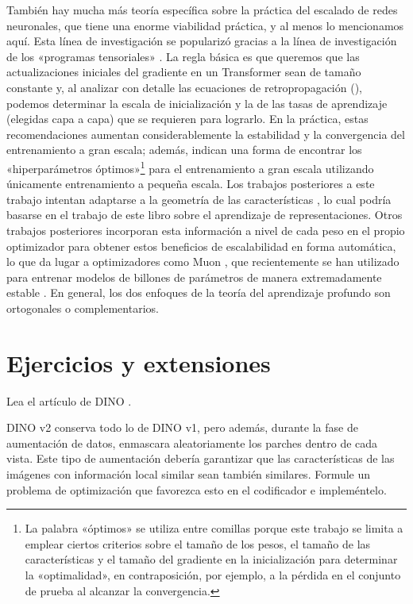 \documentclass[../../book-main_es.tex]{subfiles}
\begin{document}
También hay mucha más teoría específica sobre la práctica del
escalado de redes neuronales, que tiene una enorme viabilidad práctica, y
al menos lo mencionamos aquí. Esta línea de investigación se popularizó gracias a
la línea de investigación de los «programas tensoriales» \citep{yang2022tensor}. La
regla básica es que queremos que las actualizaciones iniciales del gradiente en un
Transformer sean de tamaño constante y, al analizar con
detalle las ecuaciones de retropropagación (), podemos
determinar la escala de inicialización y la de las tasas de aprendizaje (elegidas
capa a capa) que se requieren para lograrlo. En la práctica, estas
recomendaciones aumentan considerablemente la estabilidad y la convergencia del
entrenamiento a gran escala; además, indican una forma de encontrar los
«hiperparámetros óptimos»\footnote{La palabra «óptimos» se utiliza entre comillas porque
este trabajo se limita a emplear ciertos criterios sobre el tamaño de los pesos,
el tamaño de las características y el tamaño del gradiente en la inicialización para determinar
la «optimalidad», en contraposición, por ejemplo, a la pérdida en el conjunto de prueba al alcanzar la convergencia.}
para el entrenamiento a gran escala utilizando únicamente
entrenamiento a pequeña escala. Los trabajos posteriores a este trabajo intentan adaptarse a la geometría de las características
\citep{bernstein2024oldoptimizernewnorm}, lo cual podría
basarse en el trabajo de este libro sobre el aprendizaje de representaciones.
Otros trabajos posteriores incorporan esta información a nivel de cada peso en el
propio optimizador para obtener estos beneficios de escalabilidad en forma automática,
lo que da lugar a optimizadores como Muon \citep{jordan6muon}, que
recientemente se han utilizado para entrenar modelos de billones de parámetros de manera extremadamente estable
\citep{moonshot2025kimi}. En general, los dos enfoques de la teoría del
aprendizaje profundo son ortogonales o complementarios.

\section{Ejercicios y extensiones}

\begin{exercise}
Lea el artículo de DINO \cite{caron2021emerging}.
\end{exercise}

\begin{exercise}
DINO v2 \cite{oquab2023dinov2} conserva todo lo de DINO v1, pero además,
durante la fase de aumentación de datos, enmascara aleatoriamente los parches dentro
de cada vista. Este tipo de aumentación debería garantizar que las características
de las imágenes con información local similar sean también similares. Formule un
problema de optimización que favorezca esto en el codificador e impleméntelo.
\end{exercise}
\end{document}
